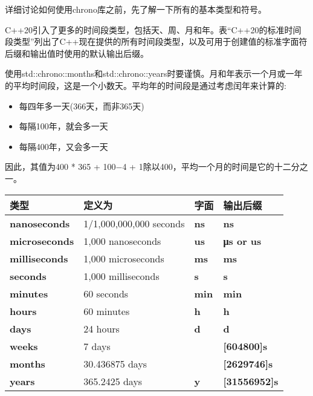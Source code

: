 
详细讨论如何使用chrono库之前，先了解一下所有的基本类型和符号。


C++20引入了更多的时间段类型，包括天、周、月和年。表“C++20的标准时间段类型”列出了C++现在提供的所有时间段类型，以及可用于创建值的标准字面符后缀和输出值时使用的默认输出后缀。

使用std::chrono::months和std::chrono::years时要谨慎。月和年表示一个月或一年的平均时间段，这是一个小数天。平均年的时间段是通过考虑闰年来计算的:

\begin{itemize}
\item
每四年多一天(366天，而非365天)

\item
每隔100年，就会多一天

\item
每隔400年，又会多一天
\end{itemize}

因此，其值为400 * 365 + 100−4 + 1除以400，平均一个月的时间是它的十二分之一。

\begin{longtable}[c]{|l|l|l|l|}
\hline
\textbf{类型}         & \textbf{定义为}     & \textbf{字面} & \textbf{输出后缀}   \\ \hline
\endfirsthead
%
\endhead
%
\textbf{nanoseconds}  & 1/1,000,000,000 seconds & \textbf{ns}      & \textbf{ns}              \\ \hline
\textbf{microseconds} & 1,000 nanoseconds       & \textbf{us}      & \textbf{μs or us}        \\ \hline
\textbf{milliseconds} & 1,000 microseconds      & \textbf{ms}      & \textbf{ms}              \\ \hline
\textbf{seconds}      & 1,000 milliseconds      & \textbf{s}       & \textbf{s}               \\ \hline
\textbf{minutes}      & 60 seconds              & \textbf{min}     & \textbf{min}             \\ \hline
\textbf{hours}        & 60 minutes              & \textbf{h}       & \textbf{h}               \\ \hline
\textbf{days}         & 24 hours                & \textbf{d}       & \textbf{d}               \\ \hline
\textbf{weeks}        & 7 days                  & \textbf{}        & \textbf{{[}604800{]}s}   \\ \hline
\textbf{months}       & 30.436875 days          & \textbf{}        & \textbf{{[}2629746{]}s}  \\ \hline
\textbf{years}        & 365.2425 days           & \textbf{y}       & \textbf{{[}31556952{]}s} \\ \hline
\end{longtable}

